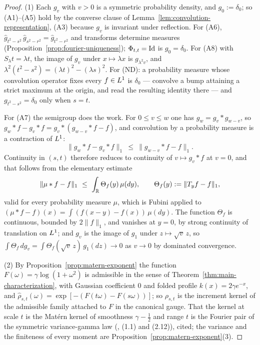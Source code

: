 \begin{proof}
(1) Each $g_v$ with $v > 0$ is a symmetric probability density, and $g_0 := \delta_0$; so
(A1)--(A5) hold by the converse clause of Lemma~\ref{lem:convolution-representation}, (A3)
because $g_v$ is invariant under reflection. For (A6),
$\hat g_{t^2-s^2}\,\hat g_{s^2-r^2} = \hat g_{t^2-r^2}$ and transforms determine measures
(Proposition~\ref{prop:fourier-uniqueness}); $\Phi_{t,t} = \mathrm{Id}$ is $g_0 = \delta_0$.
For (A8) with $S_\lambda t = \lambda t$, the image of $g_v$ under $x \mapsto \lambda x$ is
$g_{\lambda^2 v}$, and $\lambda^2(t^2 - s^2) = (\lambda t)^2 - (\lambda s)^2$. For (ND): a
probability measure whose convolution operator fixes every $f \in L^1$ is $\delta_0$ ---
convolve a bump attaining a strict maximum at the origin, and read the resulting identity
there --- and $g_{t^2-s^2} = \delta_0$ only when $s = t$.

For (A7) the semigroup does the work. For $0 \le v \le w$ one has $g_w = g_v * g_{w-v}$, so
$g_w * f - g_v * f = g_v * (g_{w-v} * f - f)$, and convolution by a probability measure is a
contraction of $L^1$:
\[
  \| g_w * f - g_v * f \|_1 \ \le\ \| g_{w-v} * f - f \|_1 .
\]
Continuity in $(s,t)$ therefore reduces to continuity of $v \mapsto g_v * f$ at $v = 0$, and that
follows from the elementary estimate
\[
  \| \mu * f - f \|_1 \ \le\ \int_{\mathbb{R}} \Theta_f(y)\, \mu(dy),
  \qquad \Theta_f(y) := \| T_{y} f - f \|_1,
\]
valid for every probability measure $\mu$, which is Fubini applied to
$(\mu * f - f)(x) = \int (f(x-y) - f(x))\,\mu(dy)$. The function $\Theta_f$ is continuous,
bounded by $2\|f\|_1$, and vanishes at $y = 0$, by strong continuity of translation on $L^1$;
and $g_v$ is the image of $g_1$ under $z \mapsto \sqrt{v}\,z$, so
$\int \Theta_f\,dg_v = \int \Theta_f(\sqrt{v}\,z)\,g_1(dz) \to 0$ as $v \to 0$ by dominated
convergence.

(2) By Proposition~\ref{prop:matern-exponent} the function
$F(\omega) = \gamma\log(1 + \omega^2)$ is admissible in the sense of
Theorem~\ref{thm:main-characterization}, with Gaussian coefficient $0$ and folded profile
$k(x) = 2\gamma e^{-x}$, and $\hat\rho_{s,t}(\omega) = \exp[-(F(t\omega) - F(s\omega))]$; so
$\rho_{s,t}$ is the increment kernel of the admissible family attached to $F$ in the
canonical gauge. That the kernel at scale $t$ is the Mat\'ern kernel of smoothness
$\gamma - \tfrac12$ and range $t$ is the Fourier pair of the symmetric variance-gamma law
(, (1.1) and (2.12)), cited; the variance and the finiteness of
every moment are Proposition~\ref{prop:matern-exponent}(3).


\end{proof}
